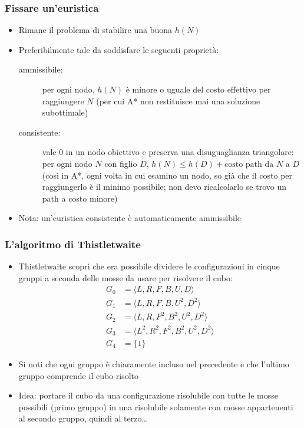 \documentclass{beamer}
\begin{document}
\begin{frame}
\frametitle{Fissare un'euristica}
\begin{itemize}
\item Rimane il problema di stabilire una buona $h(N)$
\item Preferibilmente tale da soddisfare le seguenti proprietà:
\begin{description}
\item[ammissibile:] per ogni nodo, $h(N)$ è minore o uguale del costo effettivo
per raggiungere $N$ (per cui A* non restituisce mai una soluzione subottimale)
\item[consistente:] vale $0$ in un nodo obiettivo e preserva una disuguaglianza
triangolare: per ogni nodo $N$ con figlio $D$, $h(N)\le h(D) + \text{costo
path da $N$ a $D$}$ (così in A*, ogni volta in cui esamino un nodo, so già che
il costo per raggiungerlo è il minimo possibile; non devo ricalcolarlo se trovo
un path a costo minore)
\end{description}
\item Nota: un'euristica consistente è automaticamente ammissibile
\end{itemize}
\end{frame}

\begin{frame}
\frametitle{L'algoritmo di Thistletwaite}
\begin{itemize}
\item Thistletwaite scoprì che era possibile dividere le configurazioni in
cinque gruppi a seconda delle mosse da usare per risolvere il cubo:
\begin{align*}
G_0 &= \langle L,R,F,B,U,D\rangle \\
G_1 &= \langle L,R,F,B,U^2,D^2\rangle \\
G_2 &= \langle L,R,F^2,B^2,U^2,D^2\rangle \\
G_3 &= \langle L^2,R^2,F^2,B^2,U^2,D^2\rangle \\
G_4 &= \{1\}
\end{align*}
\item Si noti che ogni gruppo è chiaramente incluso nel precedente e che 
l'ultimo gruppo comprende il cubo risolto
\item Idea: portare il cubo da una configurazione risolubile con tutte le mosse 
possibili (primo gruppo) in una risolubile solamente con mosse appartenenti al
secondo gruppo, quindi al terzo\dots
\end{itemize}
\end{frame}
\end{document}
